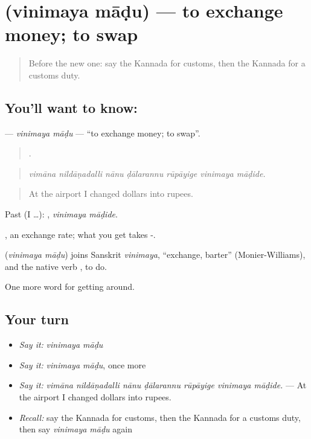\section[\texorpdfstring{\kn{ವಿನಿಮಯ} \kn{ಮಾಡು} (vinimaya māḍu)}{ವಿನಿಮಯ ಮಾಡು (vinimaya māḍu)}]{  (vinimaya māḍu) — to exchange money; to swap}

\label{lesson:KA-C439-vinimaya-madu}



\begin{quote}
Before the new one: say the Kannada for customs, then the Kannada for a customs duty.
\end{quote}

\subsection*{You'll want to know:  }
\textbf{ } — \emph{vinimaya māḍu} — \textquotedblleft{}to exchange money; to swap\textquotedblright{}.

\begin{quote}
      .
\end{quote}

\begin{quote}
\emph{vimāna nildāṇadalli nānu ḍālarannu rūpāyige vinimaya māḍide.}
\end{quote}

\begin{quote}
At the airport I changed dollars into rupees.
\end{quote}

Past (I …):  , \emph{vinimaya māḍide}.

 , an exchange rate; what you get takes -.

\begin{cousinweb}
\textbf{ } (\emph{vinimaya māḍu}) joins Sanskrit \emph{vinimaya}, \textquotedblleft{}exchange, barter\textquotedblright{} (Monier-Williams), and the native verb , to do.
\end{cousinweb}

\begin{grammarlens}[title={What you've built}]
One more word for getting around.
\end{grammarlens}

\subsection*{Your turn}
\begin{itemize}
\raggedright
  \item \emph{Say it:} \emph{vinimaya māḍu}
  \item \emph{Say it:} \emph{vinimaya māḍu}, once more
  \item \emph{Say it:} \emph{vimāna nildāṇadalli nānu ḍālarannu rūpāyige vinimaya māḍide.} — At the airport I changed dollars into rupees.
  \item \emph{Recall:} say the Kannada for customs, then the Kannada for a customs duty, then say \emph{vinimaya māḍu} again
\end{itemize}

